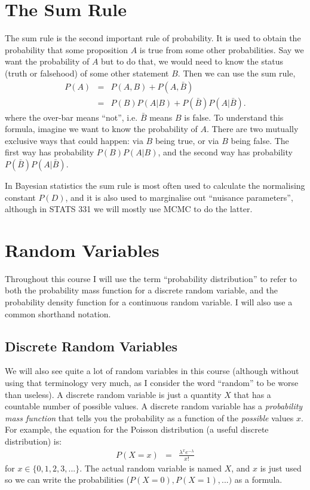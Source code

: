 \section{The Sum Rule}
The sum rule is the second important rule of probability. It is used to obtain
the probability that some proposition $A$ is true from some other
probabilities. Say we want the probability of $A$ but to do that, we would need
to know the status (truth or falsehood) of some other statement $B$. Then we
can use the sum rule,
\begin{eqnarray}
P(A) &=& P(A, B) + P(A, \bar{B})\\
&=& P(B)P(A|B) + P(\bar{B})P(A|\bar{B}).
\end{eqnarray}
where the over-bar means ``not'', i.e. $\bar{B}$ means $B$ is false. To understand
this formula, imagine we want to know the probability of $A$. There are
two mutually exclusive ways that could happen: via $B$ being true, or via $B$
being false. The first way has probability $P(B)P(A|B)$, and the second way
has probability $P(\bar{B})P(A|\bar{B})$.

In Bayesian statistics the sum rule is most often used to calculate the
normalising constant $P(D)$, and it is also used to marginalise out ``nuisance
parameters'', although in STATS 331 we will mostly use MCMC to do the latter.

\section{Random Variables}
Throughout this course I will use the term ``probability distribution'' to
refer to both the probability mass function for a discrete random variable, and
the probability density function for a continuous random variable. I will also
use a common shorthand notation.

\subsection{Discrete Random Variables}
We will also see quite a lot of random variables in this course (although
without using that terminology very much, as I consider the word ``random'' to be
worse than useless). A discrete
random variable is just a quantity $X$ that has a countable number of possible
values. A discrete random variable has a {\it probability mass function}
that tells you the probability as a function of the {\it possible} values $x$.
For example, the equation for the Poisson distribution (a useful discrete
distribution) is:
\begin{eqnarray}
P(X=x) &=& \frac{\lambda^x e^{-\lambda}}{x!}\label{eq:poisson}
\end{eqnarray}
for $x \in \{0, 1, 2, 3, ...\}$. The actual random variable is named $X$, and
$x$ is just used so we can write the probabilities ($P(X=0), P(X=1), ...)$ as
a formula.

